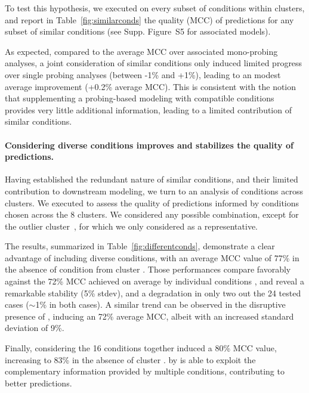 \documentclass[a4,center,fleqn]{NAR}
\begin{document}
To test this hypothesis, we executed \OurTool{} on every subset of conditions within clusters, and report in Table~\ref{fig:similarconds} the quality (MCC) of predictions for any subset of similar conditions (see Supp. Figure~S5 for associated models). 
 
As expected, compared to the average MCC over associated mono-probing analyses, a joint consideration of similar conditions only induced limited progress over single probing analyses (between -1\% and +1\%), leading to an modest average improvement (+0.2\% average MCC). This is consistent with the notion that supplementing a probing-based modeling with compatible conditions provides very little additional information, leading to a limited contribution of similar conditions. 



\paragraph{Considering diverse conditions improves and stabilizes the quality of predictions.} 
Having established the redundant nature of similar conditions, and their limited contribution to downstream modeling, we turn to an analysis of conditions across clusters.  We executed \OurTool{} to assess the quality of predictions informed by conditions chosen across the 8 clusters. We considered any possible combination, except for the outlier cluster~, for which we only considered \NAICE as a representative.

The results, summarized in Table~\ref{fig:differentconds}, demonstrate a clear advantage of including diverse conditions, with an average MCC value of 77\% in the absence of condition from cluster . Those performances compare favorably against the 72\% MCC achieved on average by individual conditions , and reveal a remarkable stability (5\% stdev), and a degradation in only two out the 24 tested cases ($\sim$1\%  in both cases).  A similar trend can be observed in the disruptive presence of \NAICE, inducing an 72\% average MCC, albeit with an increased standard deviation of 9\%.

Finally, considering the 16 conditions together induced a 80\% MCC value, increasing to 83\% in the absence of cluster .  by \OurTool{} is able to exploit the complementary information provided by multiple conditions, contributing to better predictions.
\end{document}

